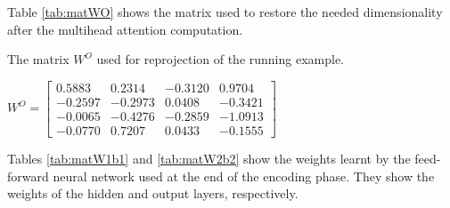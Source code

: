\documentclass[algorithms,article,submit,pdftex,moreauthors]{Definitions/mdpi}
\begin{document}
\noindent  Table \ref{tab:matWO} shows the matrix used to restore the needed dimensionality after the multihead attention computation.

\begin{table}[ht]
	\centering
	\caption{The matrix $W^O$ used for reprojection of the running example.}
	\label{tab:matWO}
	$
	W^O =   \begin{bmatrix}
				0.5883 &  0.2314 & -0.3120 &  0.9704 \\
				-0.2597 & -0.2973 &  0.0408 & -0.3421 \\
				-0.0065 & -0.4276 & -0.2859 & -1.0913 \\
				-0.0770 &  0.7207 &  0.0433 & -0.1555
			\end{bmatrix}
	$
\end{table}

\noindent Tables \ref{tab:matW1b1} and \ref{tab:matW2b2} show the weights learnt by the feed-forward neural network used at the end of the encoding phase. They show the weights of the hidden and output layers, respectively.
\end{document}
